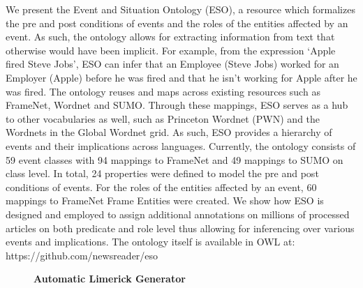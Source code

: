\documentclass[10pt, a4paper, twopage, headinclude, footinclude, BCOR5mm]{scrartcl}
\begin{document}
        \begin{table}[t!]
    \end{table}

\noindent
We present the Event and Situation Ontology (ESO), a resource which formalizes the pre and post conditions of events and the roles of the entities affected by an event. As such, the ontology allows for extracting information from text that otherwise would have been implicit. For example, from the expression ‘Apple fired Steve Jobs’, ESO can infer that an Employee (Steve Jobs) worked for an Employer (Apple) before he was fired and that he isn’t working for Apple after he was fired.  The ontology reuses and maps across existing resources such as FrameNet, Wordnet and SUMO. Through these mappings, ESO serves as a hub to other vocabularies as well, such as Princeton Wordnet (PWN) and the Wordnets in the Global Wordnet grid. As such, ESO provides a hierarchy of events and their implications across languages.  Currently, the ontology consists of  59 event classes with 94 mappings to FrameNet and  49 mappings to SUMO on class level. In total, 24 properties were defined to model the pre and post conditions of events. For the roles of the entities affected by an event, 60 mappings to FrameNet Frame Entities were created.   We show how ESO is designed and employed to assign additional annotations on millions of processed articles on both predicate and role level thus allowing for inferencing over various events and implications.  The ontology itself is available in OWL at: https://github.com/newsreader/eso 


\newpage

\begin{figure}[t!]
\centering
\large\textbf{Automatic Limerick Generator}
\vspace*{0.5cm}
\end{figure}


        \begin{table}[t!]
    \end{table}
\end{document}
